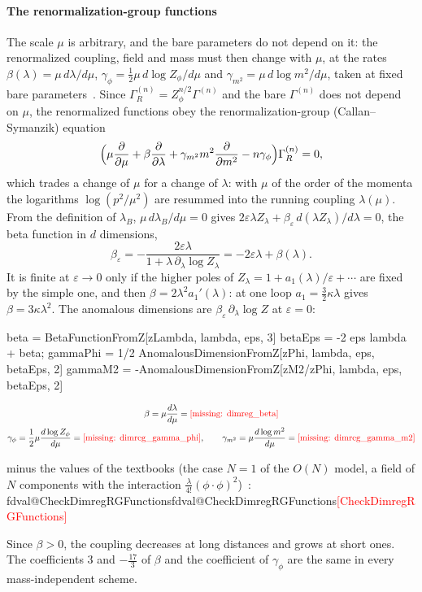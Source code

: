 \documentclass[11pt,a4paper]{article}
\makeatletter
\newcommand{\formula}[1]{\IfFileExists{figures/formula_#1.tex}{}{\text{\textcolor{red}{[missing: \detokenize{#1}]}}}}
\newcommand{\val}[1]{\ifcsname fdval@#1\endcsname\csname fdval@#1\endcsname\else\textcolor{red}{[#1]}\fi}
\makeatother
\begin{document}
\paragraph{The renormalization-group functions} The scale $\mu$ is arbitrary, and the bare parameters do not depend on it:
the renormalized coupling, field and mass must then change with $\mu$, at the rates $\beta(\lambda)=\mu\,d\lambda/d\mu$,
$\gamma_\phi=\frac12\mu\,d\log Z_\phi/d\mu$ and $\gamma_{m^2}=\mu\,d\log m^2/d\mu$, taken at fixed bare
parameters~\cite[sections~12.2--12.5]{PeskinSchroeder}. Since $\Gamma^{(n)}_R=Z_\phi^{n/2}\Gamma^{(n)}$ and the bare
$\Gamma^{(n)}$ does not depend on $\mu$, the renormalized functions obey the renormalization-group (Callan--Symanzik)
equation
\[
\Bigl(\mu\frac{\partial}{\partial\mu}+\beta\frac{\partial}{\partial\lambda}+\gamma_{m^2}m^2\frac{\partial}{\partial m^2}
-n\gamma_\phi\Bigr)\Gamma^{(n)}_R=0 ,
\]
which trades a change of $\mu$ for a change of $\lambda$: with $\mu$ of the order of the momenta the logarithms
$\log(p^2/\mu^2)$ are resummed into the running coupling $\lambda(\mu)$. From the definition of $\lambda_B$,
$\mu\,d\lambda_B/d\mu=0$ gives $2\varepsilon\lambda Z_\lambda+\beta_\varepsilon\,d(\lambda Z_\lambda)/d\lambda=0$, the beta
function in $d$ dimensions,
\[
\beta_\varepsilon=-\frac{2\varepsilon\lambda}{1+\lambda\,\partial_\lambda\log Z_\lambda}=-2\varepsilon\lambda+\beta(\lambda).
\]
It is finite at $\varepsilon\to0$ only if the higher poles of $Z_\lambda=1+a_1(\lambda)/\varepsilon+\cdots$ are fixed by the simple
one, and then $\beta=2\lambda^2a_1'(\lambda)$: at one loop $a_1=\frac32\kappa\lambda$ gives $\beta=3\kappa\lambda^2$. The
anomalous dimensions are $\beta_\varepsilon\,\partial_\lambda\log Z$ at $\varepsilon=0$:
\begin{code}
beta = BetaFunctionFromZ[zLambda, lambda, eps, 3]
betaEps = -2 eps lambda + beta;
gammaPhi = 1/2 AnomalousDimensionFromZ[zPhi, lambda, eps, betaEps, 2]
gammaM2 = -AnomalousDimensionFromZ[zM2/zPhi, lambda, eps, betaEps, 2]
\end{code}
\begin{outputbox}
\vspace{-6pt}
\begin{gather*}
\beta=\mu\frac{d\lambda}{d\mu}=\formula{dimreg_beta}\\
\gamma_\phi=\frac12\mu\frac{d\log Z_\phi}{d\mu}=\formula{dimreg_gamma_phi},\qquad
\gamma_{m^2}=\mu\frac{d\log m^2}{d\mu}=\formula{dimreg_gamma_m2}
\end{gather*}
\end{outputbox}
\begin{result}
minus the values of the textbooks (the case $N=1$ of the $O(N)$ model, a field of $N$ components with the interaction
$\frac\lambda{4!}(\phi\cdot\phi)^2$)~\cite{PeskinSchroeder,ZinnJustin2002,KleinertSchulteFrohlinde2001}:
\val{CheckDimregRGFunctions}
\end{result}
Since $\beta>0$, the coupling decreases at long distances and grows at short ones. The coefficients $3$ and $-\frac{17}{3}$
of $\beta$ and the coefficient of $\gamma_\phi$ are the same in every mass-independent scheme.
\end{document}
